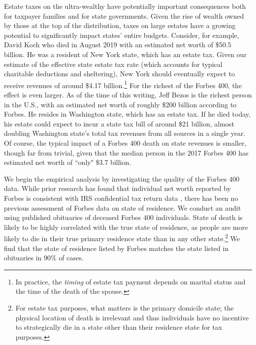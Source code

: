 \documentclass[12pt]{article}
\begin{document}
Estate taxes on the ultra-wealthy have potentially important consequences both for taxpayer families and for state governments. Given the rise of wealth owned by those at the top of the distribution, taxes on large estates have a growing potential to significantly impact states' entire budgets. 
Consider, for example, David Koch who died in August 2019 with an estimated  net worth of \$50.5 billion. He was a resident of New York state, which has an estate tax. Given our estimate  of the effective state estate tax rate (which accounts for typical charitable deductions and sheltering), New York should eventually expect to receive revenues of around  \$4.17 billion.\footnote{In practice, the {\it timing} of estate tax payment depends on marital status and the time of the death of the spouse.} 
For the richest of the Forbes 400, the effect is even larger. As of the time of this writing, Jeff Bezos is the richest person in the U.S., with an estimated net worth of roughly \$200 billion according to Forbes. He resides in Washington state, which has an estate tax. If he died today, his estate could expect to incur a state tax bill of around \$21 billion, almost doubling Washington state's total tax revenues from all sources in a single year. Of course, the typical impact of a Forbes 400 death on state revenues is smaller, though far from trivial, given that the median person in the 2017 Forbes 400 has estimated net worth of ``only" \$3.7 billion. 




We begin the empirical analysis by investigating the quality of the Forbes 400 data. 
While prior research has found that individual net worth reported by Forbes is consistent with IRS confidential tax return data \citep{saez2016wealth}, there has been no previous assessment of Forbes  data on state of residence. 
We conduct an audit using published obituaries of deceased Forbes 400 individuals. 
State of death is likely to be highly correlated  with  the  true  state  of  residence,  as  people  are  more  likely  to  die  in  their  true primary residence state than in any other state.\footnote{For estate tax purposes, what matters is the primary domicile state; the physical location of death is irrelevant and thus individuals have no incentive to strategically die in a state other than their residence state for tax purposes.}  We find that the state of residence listed by Forbes matches the state listed in obituaries in 90\% of cases. 
\end{document}
